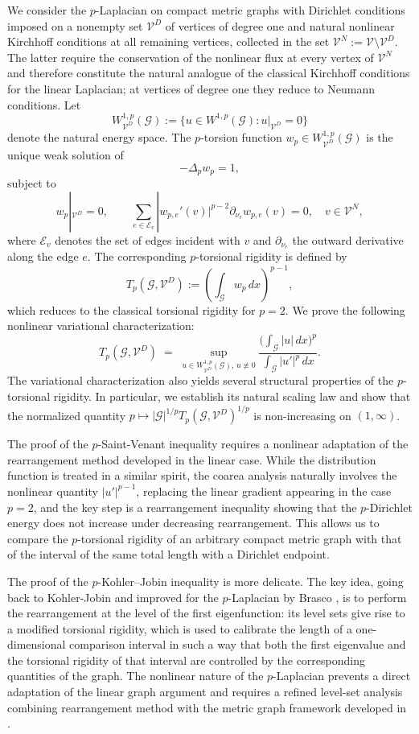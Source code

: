 \documentclass[12pt,a4paper]{article}
\numberwithin{equation}{section}
\newcommand{\WpD}{W^{1,p}_{\mathcal{V}^D}(\mathcal G)}
\newcommand{\abs}[1]{\left|#1\right|}
\begin{document}
We consider the $p$-Laplacian on compact metric graphs with Dirichlet
conditions imposed on a nonempty set $\mathcal V^D$ of vertices of degree
one and natural nonlinear Kirchhoff conditions at all remaining vertices,
collected in the set $\mathcal V^N:=\mathcal V\setminus\mathcal V^D$. The
latter require the conservation of the nonlinear flux at every vertex of
$\mathcal V^N$ and therefore constitute the natural analogue of the
classical Kirchhoff conditions for the linear Laplacian; at vertices of
degree one they reduce to Neumann conditions.
Let
\[
\WpD:=\{u\in W^{1,p}(\mathcal G):u|_{\mathcal V^D}=0\}
\]
denote the natural energy space.
The $p$-torsion function $w_p\in\WpD$ is the unique weak
solution of
\[
-\Delta_p w_p =1,
\]
subject to
\[
w_p|_{\mathcal V^D}=0,
\qquad
\sum_{e\in\mathcal E_v}
|w_{p,e}'(v)|^{p-2}
\partial_{\nu_e}w_{p,e}(v)=0,
\quad
v\in\mathcal V^N,
\]
where $\mathcal E_v$ denotes the set of edges incident with $v$ and
$\partial_{\nu_e}$ the outward derivative along the edge $e$.
The corresponding $p$-torsional rigidity is defined by
$$T_p(\mathcal{G},\mathcal{V}^D):=\left(\int_{\mathcal{G}} w_p\,dx\right)^{p-1},$$
which reduces to the classical torsional rigidity for $p=2$.
We prove the following nonlinear variational
characterization:
\[
T_p(\mathcal{G},\mathcal{V}^D)
\;=\;
\sup_{u\in\WpD,\,u\not\equiv 0}
\frac{\bigl(\int_{\mathcal{G}}\abs{u}\,dx\bigr)^p}{\int_{\mathcal{G}}\abs{u'}^p\,dx}.
\]
The variational characterization also yields several structural properties
of the $p$-torsional rigidity. In particular, we establish its natural
scaling law and show that the normalized quantity
\(
p\mapsto
|\mathcal G|^{1/p}
T_p(\mathcal G,\mathcal V^D)^{1/p}
\)
is non-increasing on $(1,\infty)$.

The proof of the $p$-Saint-Venant inequality requires a nonlinear
adaptation of the rearrangement method developed in the linear case.
While the distribution function is treated in a similar spirit, the coarea
analysis naturally involves the nonlinear quantity $|u'|^{p-1}$, replacing
the linear gradient appearing in the case $p=2$, and the key step is a
rearrangement inequality showing that the $p$-Dirichlet energy does not
increase under decreasing rearrangement. This allows us to compare the
$p$-torsional rigidity of an arbitrary compact metric graph with that of
the interval of the same total length with a Dirichlet
endpoint.

The proof of the $p$-Kohler--Jobin inequality is more delicate. The key
idea, going back to Kohler-Jobin and improved for the $p$-Laplacian by
Brasco \cite{Brasco}, is to perform the rearrangement at the level of the
first eigenfunction: its level sets give rise to a modified torsional rigidity, which is used to calibrate the length of a one-dimensional
comparison interval in such a way that both the first eigenvalue and the
torsional rigidity of that interval are controlled by the corresponding
quantities of the graph. The nonlinear nature of the $p$-Laplacian
prevents a direct adaptation of the linear graph argument and requires a
refined level-set analysis combining  rearrangement method with
the metric graph framework developed in \cite{MuPl}.
\end{document}
